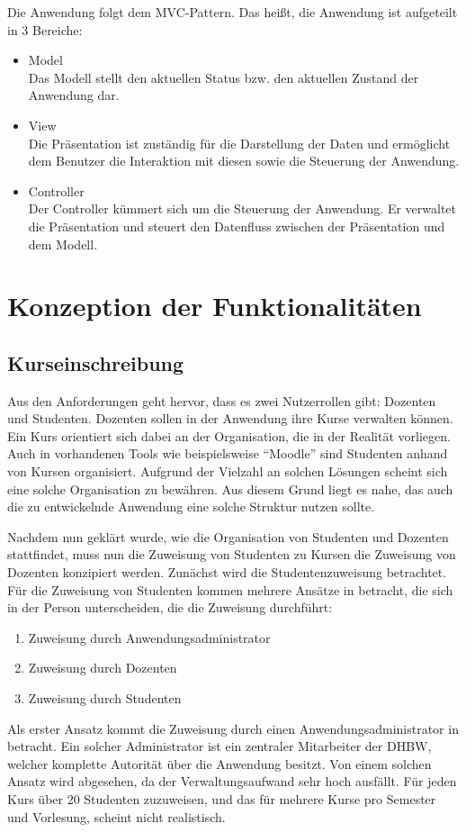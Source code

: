 Die Anwendung folgt dem \ac{MVC}-Pattern. Das heißt, die Anwendung ist aufgeteilt in 3 Bereiche:
\begin{itemize}%
    \item Model\\
        Das Modell stellt den aktuellen Status bzw. den aktuellen Zustand der Anwendung dar.
    \item View\\
        Die Präsentation ist zuständig für die Darstellung der Daten und ermöglicht dem Benutzer die Interaktion mit diesen sowie die Steuerung der Anwendung.
    \item Controller\\
        Der Controller kümmert sich um die Steuerung der Anwendung. Er verwaltet die Präsentation und steuert den Datenfluss zwischen der Präsentation und dem Modell.
\end{itemize}


\section{Konzeption der Funktionalitäten}


\subsection{Kurseinschreibung} %
Aus den Anforderungen geht hervor, dass es zwei Nutzerrollen gibt: Dozenten und Studenten.
Dozenten sollen in der Anwendung ihre Kurse verwalten können.
Ein Kurs orientiert sich dabei an der Organisation, die in der Realität vorliegen.
Auch in vorhandenen Tools wie beispielsweise \enquote{Moodle} sind Studenten anhand von Kursen organisiert.
Aufgrund der Vielzahl an solchen Lösungen scheint sich eine solche Organisation zu bewähren.
Aus diesem Grund liegt es nahe, das auch die zu entwickelnde Anwendung eine solche Struktur nutzen sollte.

Nachdem nun geklärt wurde, wie die Organisation von Studenten und Dozenten stattfindet, muss nun die Zuweisung von Studenten zu Kursen die Zuweisung von Dozenten konzipiert werden.
Zunächst wird die Studentenzuweisung betrachtet.
Für die Zuweisung von Studenten kommen mehrere Ansätze in betracht, die sich in der Person unterscheiden, die die Zuweisung durchführt:
\begin{enumerate}
    \item Zuweisung durch Anwendungsadministrator
    \item Zuweisung durch Dozenten
    \item Zuweisung durch Studenten
\end{enumerate}
Als erster Ansatz kommt die Zuweisung durch einen Anwendungsadministrator in betracht.
Ein solcher Administrator ist ein zentraler Mitarbeiter der DHBW, welcher komplette Autorität über die Anwendung besitzt.
Von einem solchen Ansatz wird abgesehen, da der Verwaltungsaufwand sehr hoch ausfällt.
Für jeden Kurs über 20 Studenten zuzuweisen, und das für mehrere Kurse pro Semester und Vorlesung, scheint nicht realistisch.

